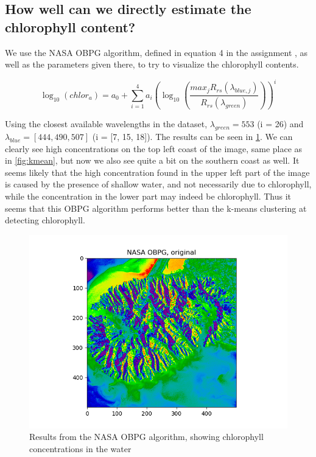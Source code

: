\subsection{How well can we directly estimate the chlorophyll content?}

We use the NASA OBPG algorithm, defined in equation 4 in the assignment 
\cite{assignment}, as well as the parameters given there, to try to 
visualize the chlorophyll contents. 

\begin{equation}
	\label{eq:task2b_estimate_chlorophyll}
	\log_{10}(chlor_a) = a_0 + \sum_{i=1}^4 a_i \left( \log_{10} \left( \frac{max_j R_{rs} (\lambda_{blue,j})} {R_{rs} (\lambda_{green})} \right) \right) ^i
\end{equation}

Using the closest available wavelengths 
in the dataset, $\lambda_{green} = 553$ (i = 26) and $\lambda_{blue} = [444, 490, 507]$ 
(i = [7, 15, 18]). The results can be seen in \cref{fig:obpg}. We can clearly 
see high concentrations on the top left coast of the image, 
same place as in \cref{fig:kmean}, but now we also see 
quite a bit on the southern coast as well. It seems likely 
that the high concentration found in the upper left part of the 
image is caused by the presence of shallow water, and not 
necessarily due to chlorophyll, while the concentration in the 
lower part may indeed be chlorophyll.  
Thus it seems that this OBPG
algorithm performs better than the k-means clustering at 
detecting chlorophyll.

\begin{figure}[h!]
    \centering
    \includegraphics[width=\textwidth]{../fig/NASA OBPG, original.png}
    \caption{Results from the NASA OBPG algorithm, showing chlorophyll concentrations 
    in the water}
    \label{fig:obpg}
\end{figure}


